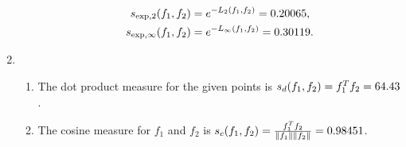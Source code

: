 \documentclass[english]{exercise}
\begin{document}
\begin{enumerate}
\begin{enumerate}
\begin{align*}
                s_{\exp, 2}\parentheses*{f_1, f_2} &= e^{-L_2\parentheses*{f_1, f_2}} = 0.20065,\\
                s_{\exp, \infty}\parentheses*{f_1, f_2} &= e^{-L_\infty\parentheses*{f_1, f_2}} = 0.30119.
            \end{align*}
        \end{enumerate}
        \item
        \begin{enumerate}
            \item The dot product measure for the given points is \(s_d\parentheses*{f_1, f_2} = f_1^T f_2 = 64.43\).
            \item The cosine measure for \(f_1\) and \(f_2\) is \(s_c\parentheses*{f_1, f_2} = \frac{f_1^T f_2}{\norm*{f_1}\norm*{f_2}} = 0.98451\).
        \end{enumerate}
    \end{enumerate}
    
    
    \section{}
    
\end{document}
